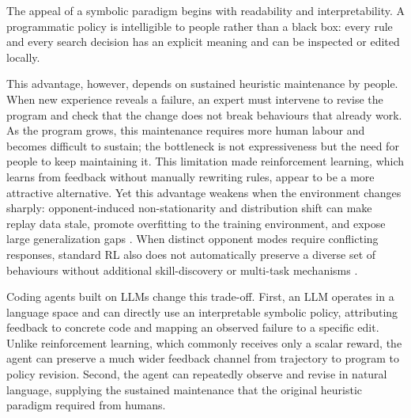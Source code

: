The appeal of a symbolic paradigm begins with readability and interpretability.
A programmatic policy is intelligible to people rather than a black box: every
rule and every search decision has an explicit meaning and can be inspected or
edited locally.

\begin{center}
\end{center}

This advantage, however, depends on sustained heuristic maintenance by people. When new
experience reveals a failure, an expert must intervene to revise the program and
check that the change does not break behaviours that already work. As the program
grows, this maintenance requires more human labour and becomes difficult to sustain;
the bottleneck is not expressiveness but the need for people to keep maintaining it.
This limitation made reinforcement learning, which learns from feedback without
manually rewriting rules, appear to be a more attractive alternative.
Yet this advantage weakens when the environment changes sharply: opponent-induced
non-stationarity and distribution shift can make replay data stale, promote
overfitting to the training environment, and expose large generalization gaps
\citep{hernandezleal2019survey,zhang2018overfitting,cobbe2019quantifying,gleave2021adversarial}.
When distinct opponent modes require conflicting responses, standard RL also does
not automatically preserve a diverse set of behaviours without additional
skill-discovery or multi-task mechanisms \citep{eysenbach2019diversity,yu2020metaworld}.

\begin{center}
\end{center}

Coding agents built on LLMs change this trade-off. First, an LLM
operates in a language space and can directly use an interpretable symbolic policy,
attributing feedback to concrete code and mapping an observed failure to a specific
edit. Unlike reinforcement learning, which commonly receives only a scalar reward,
the agent can preserve a much wider feedback channel from trajectory to program to
policy revision. Second, the agent can repeatedly observe and revise in natural
language, supplying the sustained maintenance that the original heuristic paradigm
required from humans.

